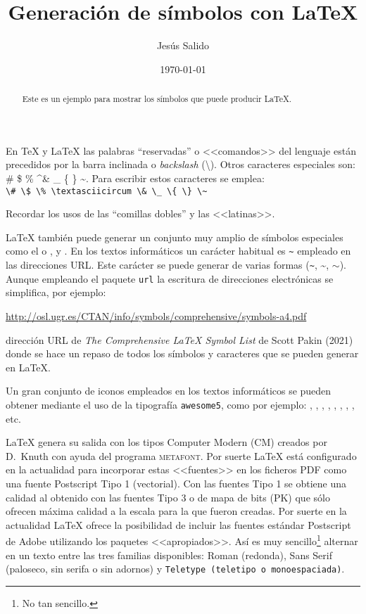 \documentclass[11pt,a4paper]{article}
\title{Generación de símbolos con \LaTeX}
\author{Jesús Salido}
\date{\today}
\begin{document}
\maketitle


\begin{abstract}
	Este es un ejemplo para mostrar los símbolos que puede producir \LaTeX.
\end{abstract}

\setcounter{page}{14}


En \TeX{} y \LaTeX{} las palabras ``reservadas'' o <<comandos>> del lenguaje están precedidos por la barra inclinada o \emph{backslash} (\textbackslash). Otros caracteres especiales son: \# \$ \% \textasciicircum \& \_ \{ \} \~{}. Para escribir estos caracteres se emplea:\\
\verb!\# \$ \% \textasciicircum \& \_ \{ \} \~!

Recordar los usos de las ``comillas dobles'' y las <<latinas>>.

\LaTeX{} también puede generar un conjunto muy amplio de símbolos especiales como el \EUR{} o \texteuro,  y \Coffeecup. En los textos informáticos un carácter habitual es \verb+~+ empleado en las direcciones URL. Este carácter se puede generar de varias formas (\verb+~+, \~{}, $\sim$). Aunque empleando el paquete \texttt{url} la escritura de direcciones electrónicas se simplifica, por ejemplo:

\url{http://osl.ugr.es/CTAN/info/symbols/comprehensive/symbols-a4.pdf}

\noindent dirección URL de \emph{The Comprehensive \LaTeX{} Symbol List} de Scott Pakin (2021) donde se hace un repaso de todos los símbolos y caracteres que se pueden generar en \LaTeX{}.

Un gran conjunto de iconos empleados en los textos informáticos se pueden obtener mediante el uso de la tipografía \texttt{awesome5}, como por ejemplo: \faNodeJs, \faNode, \faGooglePlay, \faInternetExplorer, \faGithub, \faGit*, \faWhatsapp, , etc.

\LaTeX{} genera su salida con los tipos Computer Modern (CM) creados por D.~Knuth con ayuda del programa \textsc{metafont}. Por suerte \LaTeX{} está configurado en la actualidad para incorporar estas <<fuentes>> en los ficheros PDF como una fuente Postscript Tipo 1 (vectorial). Con las fuentes Tipo 1 se obtiene una calidad al obtenido con las fuentes Tipo 3 o de mapa de bits (PK) que sólo ofrecen máxima calidad a la escala para la que fueron creadas. Por suerte en la actualidad \LaTeX{} ofrece la posibilidad de incluir las fuentes estándar Postscript de Adobe utilizando los paquetes <<apropiados>>. Así es muy sencillo\footnote{No tan sencillo.} alternar en un texto entre las tres familias disponibles: Roman (redonda), \textsf{Sans Serif (paloseco, sin serifa o sin adornos)} y \texttt{Teletype (teletipo o monoespaciada)}.
\end{document}
